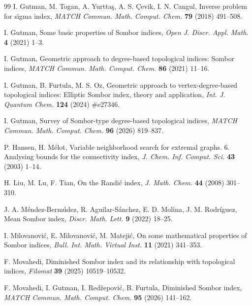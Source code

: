 \documentclass[a5paper, 10pt]{article}
\theoremstyle{plain}
\theoremstyle{remark}
\theoremstyle{definition}
\begin{document}
\begin{thebibliography}{99}
 I. Gutman,
    M. Togan, A. Yurtta\c{s}, A. S. \c{C}evik, I. N. Cangul,
    Inverse problem for sigma index,
    \textit{MATCH Commun. Math. Comput. Chem.\/}
    \textbf{79} (2018) 491--508.

 I. Gutman, Some basic properties
    of Sombor indices,
    \textit{Open J. Discr. Appl. Math.\/}
    \textbf{4} (2021) 1--3.

 I. Gutman, Geometric approach to
    degree-based topological indices: Sombor indices,
    \textit{MATCH Commun. Math. Comput. Chem.\/}
    \textbf{86} (2021) 11--16.

 I. Gutman, B. Furtula,
    M. S. Oz, Geometric approach to vertex-degree-based topological
    indices: Elliptic Sombor index, theory and application,
    \textit{Int. J. Quantum Chem.\/}
    \textbf{124} (2024) \#e27346.

 I. Gutman, Survey of
    Sombor-type degree-based topological indices,
    \textit{MATCH Commun. Math. Comput. Chem.\/}
    \textbf{96} (2026) 819--837.

 P. Hansen, H. M\'elot,
    Variable neighborhood search for extremal graphs. 6.
    Analysing bounds for the connectivity index,
    \textit{J. Chem. Inf. Comput. Sci.\/}
    \textbf{43} (2003) 1--14.

 H. Liu, M. Lu, F. Tian, On the
    Randi\'c index, \textit{J. Math. Chem.\/}
    \textbf{44} (2008) 301--310.

    J. A. M\'endez-Berm\'udez, R. Aguilar-S\'anchez,
    E. D. Molina, J. M. Rodr\'iguez, Mean Sombor index,
    \textit{Discr. Math. Lett.\/}
    \textbf{9} (2022) 18--25.

 I. Milovanovi\'c,
    E. Milovanovi\'c, M. Mateji\'c, On some mathematical properties
    of Sombor indices,
    \textit{Bull. Int. Math. Virtual Inst.\/}
    \textbf{11} (2021) 341--353.

 F. Movahedi, Diminished Sombor index and
    its relationship with topological indices,
    \textit{Filomat\/} \textbf{39} (2025) 10519--10532.

 F. Movahedi,
    I. Gutman, I. Red\v{z}epovi\'c, B. Furtula,
    Diminished Sombor index,
    \textit{MATCH Commun. Math. Comput. Chem.\/}
    \textbf{95} (2026) 141--162.


\end{thebibliography}
\end{document}
